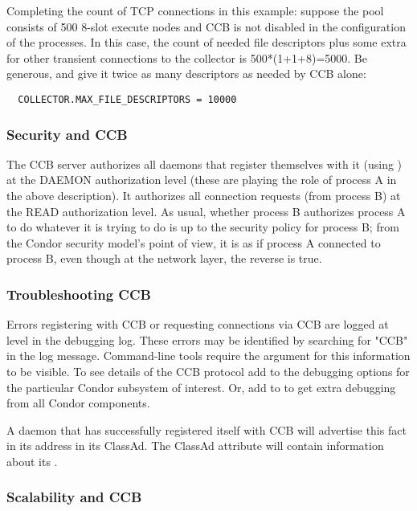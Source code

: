 Completing the count of TCP connections in this example:
suppose the pool consists of 500 8-slot
execute nodes and CCB is not disabled in the configuration of the
 processes.
In this case, the count of needed file descriptors plus some extra
for other transient connections to the collector is
500*(1+1+8)=5000.
Be generous, and give it twice as many
descriptors as needed by CCB alone:

\begin{verbatim}
  COLLECTOR.MAX_FILE_DESCRIPTORS = 10000
\end{verbatim}

\subsubsection{Security and CCB}

The CCB server authorizes all daemons that register themselves with it
(using ) at the DAEMON authorization level (these
are playing the role of process A in the above description).  It
authorizes all connection requests (from process B) at the READ
authorization level.  As usual, whether process B authorizes process A
to do whatever it is trying to do is up to the security policy for
process B; from the Condor security model's point of view, it is as if
process A connected to process B, even though at the network layer,
the reverse is true.

\subsubsection{Troubleshooting CCB}

Errors registering with CCB or requesting connections via CCB are
logged at level  in the debugging log.
These errors may be identified by searching for "CCB" in the log message.
Command-line tools require the argument
 for this information to be visible.  To see details of
the CCB protocol add  to the debugging options for
the particular Condor subsystem of interest.
Or, add  to
 to get extra debugging from all Condor
components.

A daemon that has successfully registered itself with CCB will
advertise this fact in its address in its ClassAd.  
The ClassAd attribute  will contain information
about its .

\subsubsection{Scalability and CCB}

